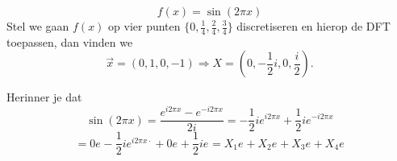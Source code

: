 \documentclass[11pt]{amsart}
\theoremstyle{definition}
\begin{document}
\title{}
\author{Jan Westerdiep}
\maketitle

\[
f(x) = \sin( 2 \pi x )
\]
Stel we gaan $f(x)$ op vier punten $\{ 0, \frac{1}{4}, \frac{2}{4}, \frac{3}{4} \}$ discretiseren en hierop de DFT toepassen, dan vinden we
\[
\vec{x} = (0, 1, 0, -1) \Rightarrow X = (0, -\frac{1}{2}i, 0, \frac{i}{2}).
\]

Herinner je dat
\[
\sin( 2 \pi x ) = \frac{e^{i 2 \pi x} - e^{- i 2 \pi x}}{2i} = -\frac{1}{2}i e^{i 2 \pi x} + \frac{1}{2} i e^{- i 2 \pi x}
\]
\[
= 0 e^{} - \frac{1}{2}i e^{i 2 \pi x \cdot } + 0 e^{} + \frac{1}{2} i e^{} = X_1 e^{} + X_2 e^{} + X_3 e^{} + X_4 e^{}
\]
\end{document}
